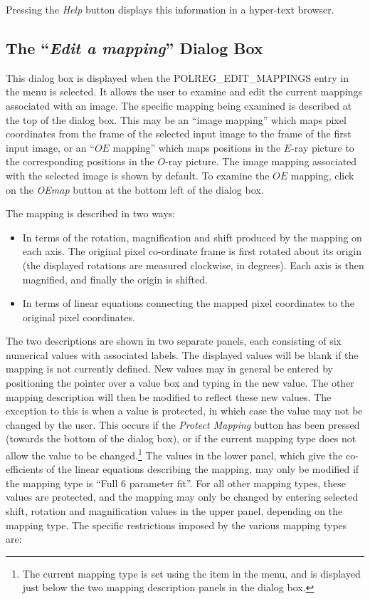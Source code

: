 Pressing the {\em Help} button displays this information in a hyper-text
browser.

\subsection {The ``{\em Edit a mapping}'' 
Dialog Box}
This dialog box is displayed when the 
{POLREG_EDIT_MAPPINGS} entry in the 
menu is selected. It allows the user to examine and edit the current
mappings associated with an image. The specific mapping being examined is
described at the top of the dialog box. This may be an ``image mapping''
which maps pixel coordinates from the frame of the selected input image
to the frame of the first input image, or an ``$OE$ mapping'' which maps
positions in the $E$-ray picture to the corresponding positions in the
$O$-ray picture. The image mapping associated with the selected image is
shown by default. To examine the $OE$ mapping, click on the {\em OEmap}
button at the bottom left of the dialog box.

The mapping is described in two ways:

\begin{itemize}
\item In terms of the rotation, magnification and shift produced
by the mapping on each axis. The original pixel co-ordinate frame 
is first rotated about its origin (the displayed rotations are measured
clockwise, in degrees). Each axis is then magnified, and finally the
origin is shifted.

\item In terms of linear equations connecting the mapped pixel
coordinates to the original pixel coordinates.
\end{itemize}

The two descriptions are shown in two separate panels, each consisting of
six numerical values with associated labels. The displayed values will be
blank if the mapping is not currently defined. New values may in general
be entered by positioning the pointer over a value box and typing in the
new value. The other mapping description will then be modified to reflect
these new values. The exception to this is when a value is protected, in
which case the value may not be changed by the user. This occurs if the
{\em Protect Mapping} button has been pressed (towards the bottom of the
dialog box), or if the current mapping type does not allow the value to
be changed.\footnote{The current mapping type is set using the  item in the
 menu, and is displayed just
below the two mapping description panels in the dialog box.} The values
in the lower panel, which give the co-efficients of the linear equations
describing the mapping, may only be modified if the mapping type is
``Full 6 parameter fit''. For all other mapping types, these values are
protected, and the mapping may only be changed by entering selected
shift, rotation and magnification values in the upper panel, depending on
the mapping type. The specific restrictions imposed by the various
mapping types are:



